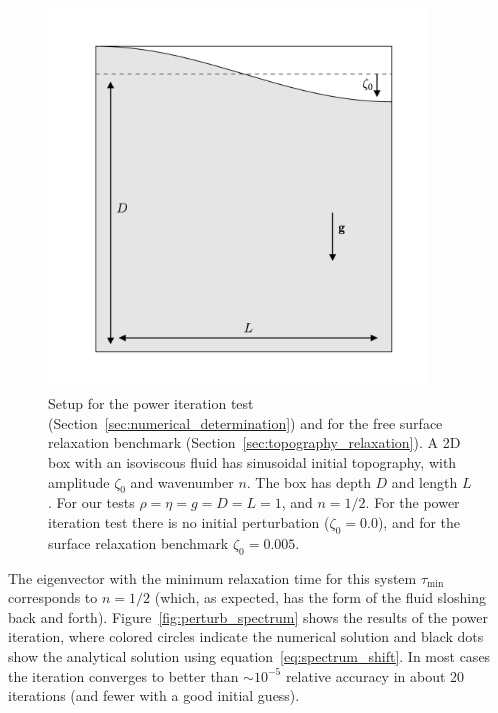 \documentclass[preprint,12pt,authoryear]{elsarticle}
\begin{document}
\begin{figure}
\includegraphics[width=0.9\textwidth]{figures/benchmark_setup.pdf}
\caption[Setup for the power iteration test (Section~\ref{sec:numerical_determination}) and for the free surface relaxation benchmark (Section~\ref{sec:topography_relaxation}).]{Setup for the power iteration test (Section~\ref{sec:numerical_determination}) and for the free surface relaxation benchmark (Section~\ref{sec:topography_relaxation}). A 2D box with an isoviscous fluid has sinusoidal initial topography, with amplitude $\zeta_0$ and wavenumber $n$. The box has depth $D$ and length $L$. For our tests $\rho = \eta = g = D = L = 1$, and $n=1/2$. For the power iteration test there is no initial perturbation ($\zeta_0 = 0.0$), and for the surface relaxation benchmark $\zeta_0 = 0.005$.}
\label{fig:benchmark_setup}
\end{figure}
The eigenvector with the minimum relaxation time for this system $\tau_{\min}$ corresponds to $n=1/2$ 
(which, as expected, has the form of the fluid sloshing back and forth).
Figure~\ref{fig:perturb_spectrum} shows the results of the power iteration, where colored circles indicate the numerical
solution and black dots show the analytical solution using equation~\eqref{eq:spectrum_shift}.
In most cases the iteration converges to better than $\sim10^{-5}$ relative accuracy in about 20 iterations
(and fewer with a good initial guess).
\end{document}
